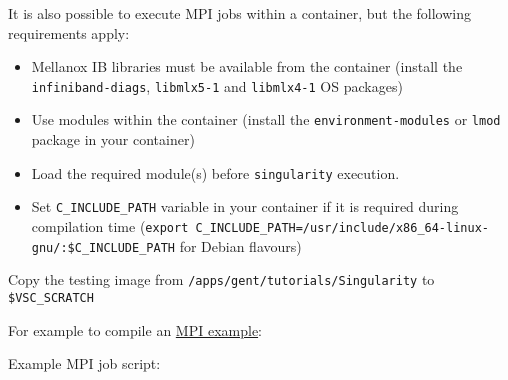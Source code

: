 It is also possible to execute MPI jobs within a container, but the following requirements apply:

\begin{itemize}
    \item Mellanox IB libraries must be available from the container (install the \lstinline|infiniband-diags|, \lstinline|libmlx5-1| and \lstinline|libmlx4-1| OS packages)
    \item Use modules within the container (install the \lstinline|environment-modules| or \lstinline|lmod| package in your container)
    \item Load the required module(s) before \lstinline|singularity| execution.
    \item Set \lstinline|C_INCLUDE_PATH| variable in your container if it is required during
        compilation time (\lstinline|export C_INCLUDE_PATH=/usr/include/x86_64-linux-gnu/:$C_INCLUDE_PATH| for Debian flavours)
\end{itemize}

Copy the testing image from \lstinline|/apps/gent/tutorials/Singularity| to \lstinline|$VSC_SCRATCH|

\begin{prompt}
\end{prompt}

For example to compile an
\href{https://github.com/open-mpi/ompi/blob/master/examples/ring_c.c}{MPI example}:

\begin{prompt}
\end{prompt}

Example MPI job script:

